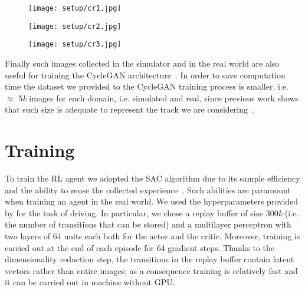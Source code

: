 \begin{figure}[h]
	\begin{minipage}{.33\textwidth}
		\centering
		\texttt{[image: setup/cr1.jpg]}
	\end{minipage}%
	\begin{minipage}{.33\textwidth}
		\centering
		\texttt{[image: setup/cr2.jpg]}
	\end{minipage}%
	\begin{minipage}{.33\textwidth}
		\centering
		\texttt{[image: setup/cr3.jpg]}
	\end{minipage}
	\label{fig:datasetrealcropped}
\end{figure}

Finally such images collected in the simulator and in the real world are also useful for training the CycleGAN architecture~\cite{CycleGAN2017}. In order to save computation time the dataset we provided to the CycleGAN training process is smaller, i.e. $\approx$ 5\textit{k} images for each domain, i.e. simulated and real, since previous work shows that such size is adequate to represent the track we are considering~\cite{stocco-mind}.


\section{Training}

To train the RL agent we adopted the SAC algorithm due to its sample efficiency and the ability to reuse the collected experience~\cite{art:sac}. Such abilities are paramount when training an agent in the real world. We used the hyperparameters provided by \cite{learning-to-drive-in-5-minutes} for the task of driving. In particular, we chose a replay buffer of size $300$\textit{k} (i.e. the number of transitions that can be stored) and a multilayer perceptron with two layers of 64 units each both for the actor and the critic. Moreover, training is carried out at the end of each episode for 64 gradient steps. Thanks to the dimensionality reduction step, the transitions in the replay buffer contain latent vectors rather than entire images; as a consequence training is relatively fast and it can be carried out in machine without GPU. 

